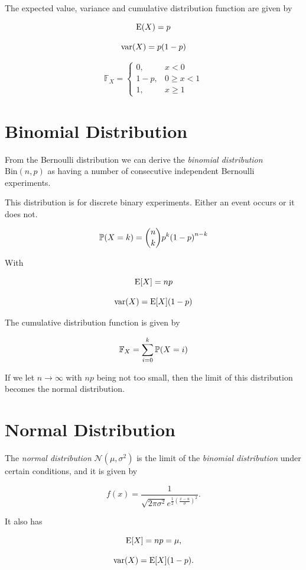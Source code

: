 The expected value, variance and cumulative distribution function are given by 

\[
    \mathrm{E}(X) = p
\]

\[
    \mathrm{var}(X) = p(1 - p)
\]

\[
    \mathbb{F}_X = 
    \begin{cases}
        0, & x < 0 \\ 
        1 - p, & 0 \ge x < 1 \\ 
        1, & x \ge 1 
    \end{cases}
\]

\section{Binomial Distribution}

From the Bernoulli distribution we can derive the \emph{binomial distribution} \(\mathrm{Bin}(n, p)\) as having a number 
of consecutive independent Bernoulli experiments.

This distribution is for discrete binary experiments. Either an event occurs or it does not. 

\[
    \mathbb{P}(X = k) = \binom{n}{k} p^k {(1 - p)}^{n - k}
\]

With 

\[
    \mathrm{E}[X] = np
\]

\[
    \mathrm{var}(X) = \mathrm{E}[X](1-p)
\]

The cumulative distribution function is given by

\[
    \mathbb{F}_X = \sum_{i = 0}^{k} \mathbb{P}(X = i)
\]

If we let \(n \to \infty\) with \(np\) being not too small, then the limit of this distribution becomes the normal distribution.

\section{Normal Distribution}

The \emph{normal distribution} \(\mathcal{N}(\mu, \sigma^2)\) is the limit of the \emph{binomial distribution} under certain conditions, and it is given by 

\[
    f(x) = \frac{1}{\sqrt{2\pi \sigma^2} e^{\frac{1}{2}{\left(\frac{x - u}{\sigma}\right)}^2}}.
\]

It also has 

     
\[
    \mathrm{E}[X] = np = \mu,
\]
    
\[
    \mathrm{var}(X) = \mathrm{E}[X] (1-p).
\]

